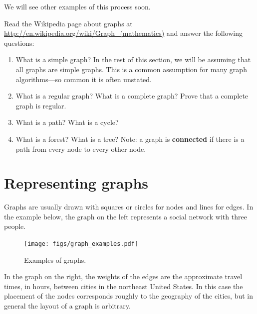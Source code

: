 \documentclass[10pt]{book}
\begin{document}
We will see other examples of this process soon.

\begin{exercise}

Read the Wikipedia page about graphs at
\url{http://en.wikipedia.org/wiki/Graph_(mathematics)}
and answer the following questions:

\begin{enumerate}

\item What is a simple graph?  In the rest of this section,
we will be assuming that all graphs are simple graphs.  This
is a common assumption for many graph algorithms---so
common it is often unstated.

\item What is a regular graph?  What is a complete graph?  Prove
that a complete graph is regular.

\item What is a path?  What is a cycle?

\item What is a forest?  What is a tree?  Note: a graph
is {\bf connected} if there is a path from every node to
every other node.

\end{enumerate}

\end{exercise}



\section{Representing graphs}
\label{graph.py}

Graphs are usually drawn with squares or circles for nodes and lines
for edges.  In the example below, the graph on the left represents
a social network with three people.


\begin{figure}
\centerline{\texttt{[image: figs/graph\_examples.pdf]}}
\caption{Examples of graphs.}
\end{figure}

In the graph on the right, the weights of the edges are the
approximate travel times, in hours, between cities in the northeast
United States.  In this case the placement of the nodes corresponds
roughly to the geography of the cities, but in general the layout
of a graph is arbitrary.
\end{document}
